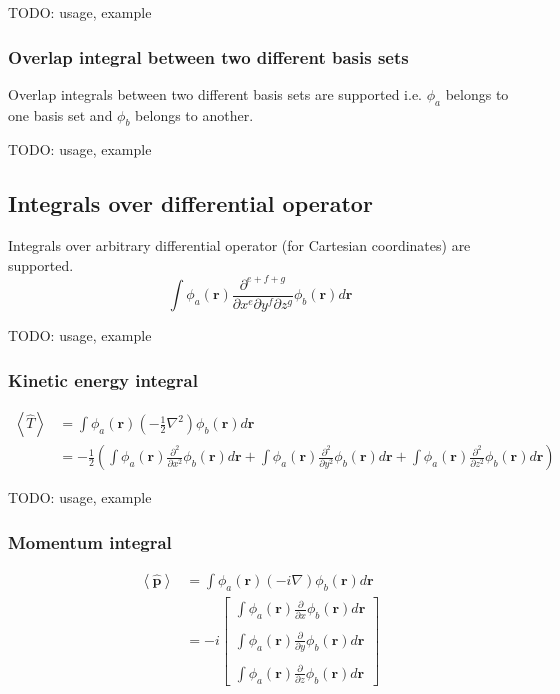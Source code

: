 \documentclass[letterpaper]{article}
\begin{document}
TODO: usage, example
\subsubsection{Overlap integral between two different basis sets}
Overlap integrals between two different basis sets are supported i.e.
$\phi_a$ belongs to one basis set and $\phi_b$ belongs to another.

TODO: usage, example
\subsection{Integrals over differential operator}
Integrals over arbitrary differential operator (for Cartesian coordinates) are
supported.
\begin{equation}
  \int
  \phi_a(\mathbf{r}) \frac{\partial^{e+f+g}}{\partial x^e \partial y^f \partial z^g} \phi_b(\mathbf{r})
  d\mathbf{r}
\end{equation}

TODO: usage, example
\subsubsection{Kinetic energy integral}
\begin{equation}
  \label{eq:kinetic_energy}
  \begin{split}
    \left< \hat{T} \right>
    &= \int \phi_a(\mathbf{r}) \left( -\frac{1}{2} \nabla^2 \right) \phi_b(\mathbf{r}) d\mathbf{r}\\
    &= -\frac{1}{2}
    \left(
      \int \phi_a(\mathbf{r}) \frac{\partial^2}{\partial x^2} \phi_b(\mathbf{r}) d\mathbf{r}
      + \int \phi_a(\mathbf{r}) \frac{\partial^2}{\partial y^2} \phi_b(\mathbf{r}) d\mathbf{r}
      + \int \phi_a(\mathbf{r}) \frac{\partial^2}{\partial z^2} \phi_b(\mathbf{r}) d\mathbf{r}
    \right)
  \end{split}
\end{equation}

TODO: usage, example
\subsubsection{Momentum integral}
\begin{equation}
  \label{eq:momentum}
  \begin{split}
    \left< \hat{\mathbf{p}} \right>
    &= \int \phi_a(\mathbf{r}) \left( -i \nabla \right) \phi_b(\mathbf{r}) d\mathbf{r}\\
    &= -i
    \begin{bmatrix}
      \int \phi_a(\mathbf{r}) \frac{\partial}{\partial x} \phi_b(\mathbf{r}) d\mathbf{r}\\\\
      \int \phi_a(\mathbf{r}) \frac{\partial}{\partial y} \phi_b(\mathbf{r}) d\mathbf{r}\\\\
      \int \phi_a(\mathbf{r}) \frac{\partial}{\partial z} \phi_b(\mathbf{r}) d\mathbf{r}
    \end{bmatrix}
  \end{split}
\end{equation}
\end{document}
